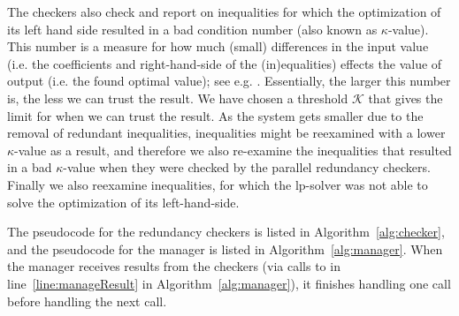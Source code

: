 The checkers also check and report on inequalities for which the optimization of its left hand side resulted in a bad condition number (also known as $\kappa$-value). This number is a measure for how much (small) differences in the input value (i.e. the coefficients and right-hand-side of the (in)equalities) effects the value of output (i.e. the found optimal value); see {e.g. \cite{numAnalysis}}. Essentially, the larger this number is, the less we can trust the result. We have chosen a threshold $\mathcal{K}$ that gives the limit for when we can trust the result. As the system gets smaller due to the removal of redundant inequalities, inequalities might be reexamined with a lower $\kappa$-value as a result, and therefore we also re-examine the inequalities that resulted in a bad $\kappa$-value when they were checked by the parallel redundancy checkers. 
Finally we also reexamine inequalities, for which the lp-solver was not able to solve the optimization of its left-hand-side.

The pseudocode for the redundancy checkers is listed in Algorithm~\ref{alg:checker}, and the pseudocode for the manager is listed in Algorithm~\ref{alg:manager}. 
When the manager receives results from the checkers (via calls to  in line~\ref{line:manageResult} in Algorithm~\ref{alg:manager}), it finishes handling one call before handling the next call. %

